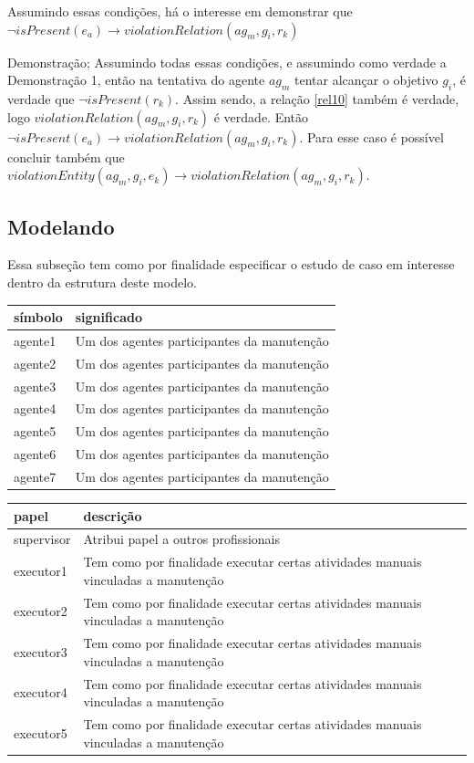 \documentclass[12pt]{article}
\begin{document}
Assumindo essas condições, há o interesse em demonstrar que $ \neg isPresent(e_a)  \to violationRelation(ag_m,g_i,r_k) $	

Demonstração; 
Assumindo todas essas condições, e assumindo como verdade a Demonstração 1, então na tentativa do agente $ag_m$ tentar alcançar o objetivo $g_i$, é verdade que $\neg isPresent(r_k)$. Assim sendo, a relação \ref{rel10} também é verdade, logo $violationRelation(ag_m,g_i,r_k)$ é verdade. Então $\neg isPresent(e_a) \to violationRelation(ag_m,g_i,r_k)$. Para esse caso é possível concluir também que $violationEntity(ag_m,g_i,e_k) \to violationRelation(ag_m,g_i,r_k)$.


\subsection{Modelando}

Essa subseção tem como por finalidade especificar o estudo de caso em interesse dentro da estrutura deste modelo. 

\begin{table}[H]
\centering
\begin{tabular}{|l|l|}
\hline
\textbf{símbolo} & \textbf{significado} \\ \hline
agente1 & Um dos agentes participantes da manutenção \\ \hline
agente2 & Um dos agentes participantes da manutenção \\ \hline
agente3 & Um dos agentes participantes da manutenção \\ \hline
agente4 & Um dos agentes participantes da manutenção \\ \hline
agente5 & Um dos agentes participantes da manutenção \\ \hline
agente6 & Um dos agentes participantes da manutenção \\ \hline
agente7 & Um dos agentes participantes da manutenção \\ \hline
\end{tabular}
\end{table}


\begin{table}[H]
\centering
\begin{tabular}{|l|l|}
\hline
\textbf{papel} & \textbf{descrição} \\ \hline
supervisor & Atribui papel a outros profissionais \\ \hline
executor1 & Tem como por finalidade executar certas atividades manuais vinculadas a manutenção \\ \hline
executor2 & Tem como por finalidade executar certas atividades manuais vinculadas a manutenção \\ \hline
executor3 & Tem como por finalidade executar certas atividades manuais vinculadas a manutenção \\ \hline
executor4 & Tem como por finalidade executar certas atividades manuais vinculadas a manutenção \\ \hline
executor5 & Tem como por finalidade executar certas atividades manuais vinculadas a manutenção \\ \hline
\end{tabular}
\end{table}
\end{document}
